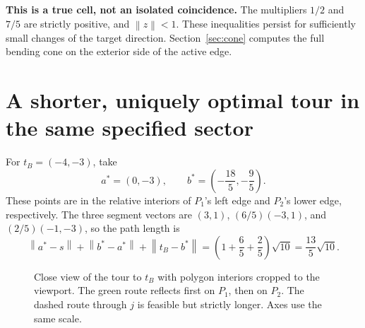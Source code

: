 \documentclass[11pt,a4paper]{article}
\newcommand{\norm}[1]{\left\lVert#1\right\rVert}
\newcommand{\sect}[2]{\section{#1}\label{#2}}
\begin{document}
\begin{resultbox}
\textbf{This is a true cell, not an isolated coincidence.} The multipliers
$1/2$ and $7/5$ are strictly positive, and $\norm{z}<1$. These inequalities
persist for sufficiently small changes of the target direction. Section~\ref{sec:cone}
computes the full bending cone on the exterior side of the active edge.
\end{resultbox}

\clearpage
\sect{A shorter, uniquely optimal tour in the same specified sector}{sec:b}

For $t_B=(-4,-3)$, take
\begin{equation}
 a^*=(0,-3),\qquad b^*=\left(-\frac{18}{5},-\frac95\right).
 \label{eq:b-contacts}
\end{equation}
These points are in the relative interiors of $P_1$'s left edge and $P_2$'s
lower edge, respectively. The three segment vectors are
$(3,1)$, $(6/5)(-3,1)$, and $(2/5)(-1,-3)$, so the path length is
\begin{equation}
 \norm{a^*-s}+\norm{b^*-a^*}+\norm{t_B-b^*}
   =\left(1+\frac65+\frac25\right)\sqrt{10}=\frac{13}{5}\sqrt{10}.
 \label{eq:b-length}
\end{equation}

\begin{figure}[h!]
\centering
{}
\caption{Close view of the tour to $t_B$ with polygon interiors cropped to the
viewport. The green route reflects first on $P_1$, then on $P_2$. The dashed
route through $j$ is feasible but strictly longer. Axes use the same scale.}
\label{fig:b}
\end{figure}
\end{document}
